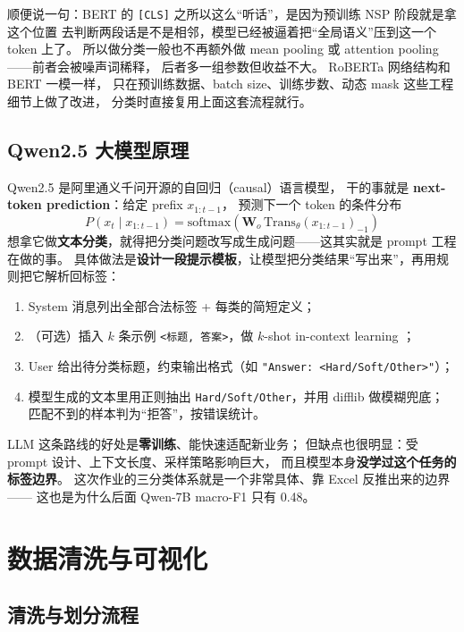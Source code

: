 \documentclass{SYSUReport}
\begin{document}
顺便说一句：BERT 的 \texttt{[CLS]} 之所以这么“听话”，是因为预训练 NSP 阶段就是拿这个位置
去判断两段话是不是相邻，模型已经被逼着把“全局语义”压到这一个 token 上了。
所以做分类一般也不再额外做 mean pooling 或 attention pooling——前者会被噪声词稀释，
后者多一组参数但收益不大。
RoBERTa \cite{liu2019roberta} 网络结构和 BERT 一模一样，
只在预训练数据、batch size、训练步数、动态 mask 这些工程细节上做了改进，
分类时直接复用上面这套流程就行。


\subsection{Qwen2.5 大模型原理}

Qwen2.5 \cite{yang2024qwen2} 是阿里通义千问开源的自回归（causal）语言模型，
干的事就是 \textbf{next-token prediction}：给定 prefix $x_{1:t-1}$，
预测下一个 token 的条件分布
\begin{equation}
    P(x_t \mid x_{1:t-1}) = \mathrm{softmax}\left(\mathbf{W}_o\,\mathrm{Trans}_{\theta}(x_{1:t-1})_{-1}\right)
    \label{eq:qwen-lm}
\end{equation}
想拿它做\textbf{文本分类}，就得把分类问题改写成生成问题——这其实就是 prompt 工程在做的事。
具体做法是\textbf{设计一段提示模板}，让模型把分类结果“写出来”，再用规则把它解析回标签：
\begin{enumerate}
    \item System 消息列出全部合法标签 + 每类的简短定义；
    \item （可选）插入 $k$ 条示例 \texttt{<标题, 答案>}，做 $k$-shot in-context learning \cite{brown2020gpt3}；
    \item User 给出待分类标题，约束输出格式（如 \texttt{"Answer: <Hard/Soft/Other>"}）；
    \item 模型生成的文本里用正则抽出 \texttt{Hard/Soft/Other}，并用 difflib 做模糊兜底；
          匹配不到的样本判为“拒答”，按错误统计。
\end{enumerate}

LLM 这条路线的好处是\textbf{零训练}、能快速适配新业务；
但缺点也很明显：受 prompt 设计、上下文长度、采样策略影响巨大，
而且模型本身\textbf{没学过这个任务的标签边界}。
这次作业的三分类体系就是一个非常具体、靠 Excel 反推出来的边界——
这也是为什么后面 Qwen-7B macro-F1 只有 0.48。


\section{数据清洗与可视化}

\subsection{清洗与划分流程}
\end{document}
